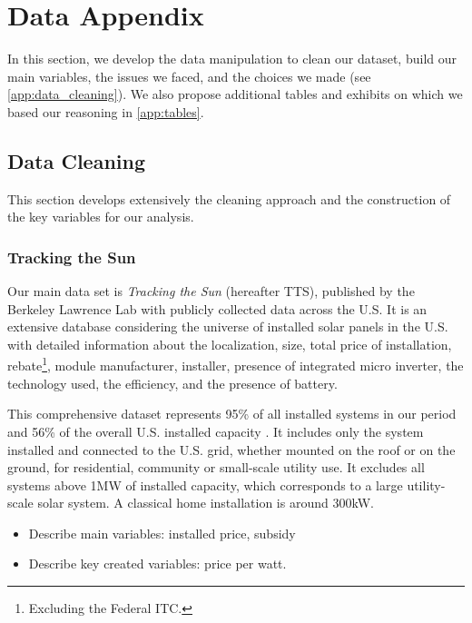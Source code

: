 \section{Data Appendix}

In this section, we develop the data manipulation to clean our dataset, build our main variables, the issues we faced, and the choices we made (see \autoref{app:data_cleaning}). We also propose additional tables and exhibits on which we based our reasoning in \autoref{app:tables}.

\subsection{Data Cleaning} \label{app:data_cleaning}

This section develops extensively the cleaning approach and the construction of the key variables for our analysis. 

\subsubsection{Tracking the Sun}
Our main data set is \textit{Tracking the Sun} (hereafter TTS), published by the Berkeley Lawrence Lab with publicly collected data across the U.S. It is an extensive database considering the universe of installed solar panels in the U.S. with detailed information about the localization, size, total price of installation, rebate\footnote{Excluding the Federal ITC.}, module manufacturer, installer, presence of integrated micro inverter, the technology used, the efficiency, and the presence of battery. 

This comprehensive dataset represents 95\% of all installed systems in our period and 56\% of the overall U.S. installed capacity \citep{houdeIncidenceUSChinaSolar2023}. It includes only the system installed and connected to the U.S. grid, whether mounted on the roof or on the ground, for residential, community or small-scale utility use. It excludes all systems above 1MW of installed capacity, which corresponds to a large utility-scale solar system. A classical home installation is around 300kW.

\begin{tcolorbox}[title = To Do, colback = white, colframe = orange]
    \begin{itemize}
        \item Describe main variables: installed price, subsidy
        \item Describe key created variables: price per watt.
    \end{itemize}
\end{tcolorbox}

